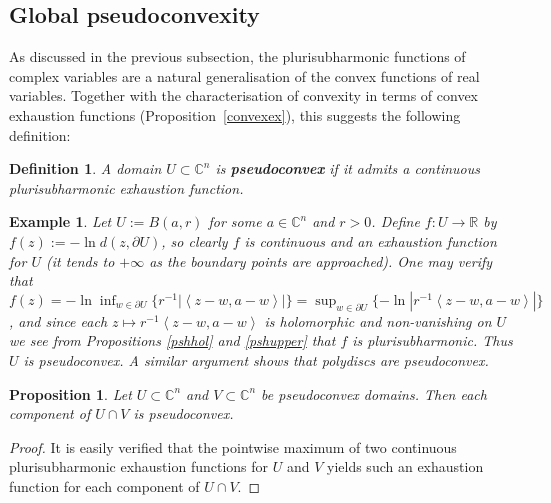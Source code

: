 \documentclass[11pt,a4paper, final, twoside]{article}
\newtheorem{definition}[theorem]{Definition}
\newtheorem{example}[theorem]{Example}
\newtheorem{proposition}[theorem]{Proposition}
\numberwithin{equation}{section}
\newcommand{\C}{\mathbb C}
\newcommand{\R}{\mathbb R}
\newcommand{\bd}{\partial}
\newcommand{\ball}{B}
\newcommand{\emetric}{d}
\renewcommand{\sp}[2]{\left<#1,#2\right>}
\begin{document}
\subsection{Global pseudoconvexity}
As discussed in the previous subsection, the plurisubharmonic functions of complex variables are a natural generalisation of the convex functions of real variables. Together with the characterisation
of convexity in terms of convex exhaustion functions (Proposition~\ref{convexex}), this suggests the following definition:
\begin{definition}
A domain $U\subset\C^n$ is \textbf{pseudoconvex} if it admits a continuous plurisubharmonic exhaustion function.
\end{definition}
\begin{example}
\label{ballex}
Let $U:=\ball(a,r)$ for some $a\in\C^n$ and $r>0$. Define $f\colon U\to\R$ by $f(z):=-\ln\emetric(z,\bd U)$, so clearly $f$ is continuous and an exhaustion function for $U$ (it tends to $+\infty$ as the boundary
points are approached). One may verify that $f(z)=-\ln\inf_{w\in\bd U} \{r^{-1} |\!\sp{z-w}{a-w}\!|\} = \sup_{w\in\bd U} \{-\ln |r^{-1}\! \sp{z-w}{a-w}\!|\}$, and 
since each $z\mapsto r^{-1} \sp{z-w}{a-w}$ is holomorphic and non-vanishing on $U$ we see from Propositions \ref{pshhol} and \ref{pshupper} that $f$ is plurisubharmonic. Thus $U$ is pseudoconvex.
A similar argument shows that
polydiscs are pseudoconvex.
\end{example} 
\begin{proposition}
\label{psint}
Let $U\subset\C^n$ and $V\subset\C^n$ be pseudoconvex domains. Then each component of $U\cap V$ is pseudoconvex.
\end{proposition}
\begin{proof}
It is easily verified that the pointwise maximum of two continuous plurisubharmonic exhaustion functions for $U$ and $V$ yields such an exhaustion function for each component of $U\cap V$.
\end{proof}
\end{document}
